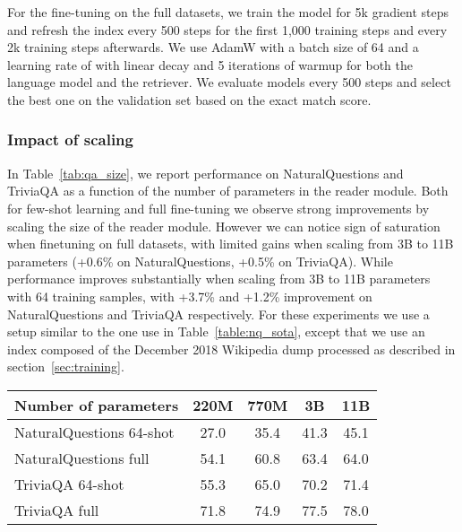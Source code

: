 \documentclass[10pt]{article} \usepackage[preprint]{tmlr}
\begin{document}
For the fine-tuning on the full datasets, we train the model for 5k gradient steps and refresh the index every 500 steps for the first 1,000 training steps and every 2k training steps afterwards.
We use AdamW with a batch size of 64 and a learning rate of  with linear decay and 5 iterations of warmup for both the language model and the retriever.
We evaluate models every 500 steps and select the best one on the validation set based on the exact match score.

\subsubsection{Impact of scaling}
In Table~\ref{tab:qa_size}, we report performance on NaturalQuestions and TriviaQA as a function of the number of parameters in the reader module.
Both for few-shot learning and full fine-tuning we observe strong improvements by scaling the size of the reader module.
However we can notice sign of saturation when finetuning on full datasets, with limited gains when scaling from 3B to 11B parameters (+0.6\% on NaturalQuestions, +0.5\% on TriviaQA).
While performance improves substantially when scaling from 3B to 11B parameters with 64 training samples, with +3.7\% and +1.2\% improvement on NaturalQuestions and TriviaQA respectively.
For these experiments we use a setup similar to the one use in Table~\ref{table:nq_sota}, except that we use an index composed of the December 2018 Wikipedia dump processed as described in section~\ref{sec:training}.


\begin{table*}

    \centering
    \begin{tabular}{lcccc}
    \toprule
    Number of parameters & 220M & 770M & 3B & 11B \\
    \midrule
    NaturalQuestions 64-shot & 27.0 & 35.4 & 41.3 & 45.1 \\
    NaturalQuestions full & 54.1 & 60.8 & 63.4 & 64.0 \\ 
    \midrule
    TriviaQA 64-shot & 55.3 & 65.0 & 70.2 & 71.4 \\
    TriviaQA full & 71.8 & 74.9 & 77.5 & 78.0 \\
    \bottomrule
    \end{tabular}
    \caption{
    \textbf{Impact of model size on question answering datasets.} We report exact match performance on the test sets of NaturalQuestions and TriviaQA filtered depending on the number of parameters in the reader module. For these experiments the index contains the December 2018 Wikipedia dump.}
    \label{tab:qa_size}
\end{table*}
\end{document}
